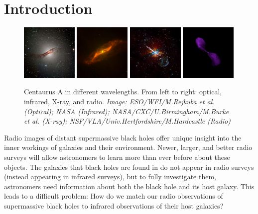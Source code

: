 
\chapter{Introduction}
\label{cha:intro}

\begin{figure}
  \centering
  \includegraphics[width=0.24\textwidth]{images/centaurus_a_optical}
  \includegraphics[width=0.24\textwidth]{images/centaurus_a_infrared}
  \includegraphics[width=0.24\textwidth]{images/centaurus_a_xray}
  \includegraphics[width=0.24\textwidth]{images/centaurus_a_radio}
  \caption{Centaurus A in different wavelengths. From left to right: optical,
    infrared, X-ray, and radio. \emph{Image: ESO/WFI/M.Rejkuba et al. (Optical);
    NASA (Infrared); NASA/CXC/U.Birmingham/M.Burke et al. (X-ray);
    NSF/VLA/Univ.Hertfordshire/M.Hardcastle (Radio)}}
  \label{fig:different-wavelengths}
\end{figure}

Radio images of distant supermassive black holes offer unique insight into the
inner workings of galaxies and their environment. Newer, larger, and better
radio surveys will allow astronomers to learn more than ever before about these
objects. The galaxies that black holes are found in do not appear in radio
surveys (instead appearing in infrared surveys), but to fully investigate them,
astronomers need information about both the black hole and its host galaxy. This
leads to a difficult problem: How do we match our radio observations of
supermassive black holes to infrared observations of their host galaxies?

